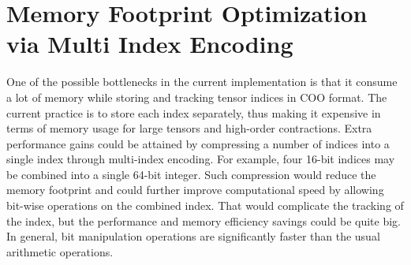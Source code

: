 \section{Memory Footprint Optimization via Multi Index Encoding}
One of the possible bottlenecks in the current implementation is that it consume a lot of 
memory while storing and tracking tensor indices in COO format. The current practice is to 
store each index separately, thus making it expensive in terms of memory usage for large 
tensors and high-order contractions. Extra performance gains could be attained by compressing 
a number of indices into a single index through multi-index encoding. For example, four 
16-bit indices may be combined into a single 64-bit integer. Such compression would reduce 
the memory footprint and could further improve computational speed by allowing bit-wise 
operations on the combined index. That would complicate the tracking of the index, but the 
performance and memory efficiency savings could be quite big. In general, bit manipulation 
operations are significantly faster than the usual arithmetic operations.